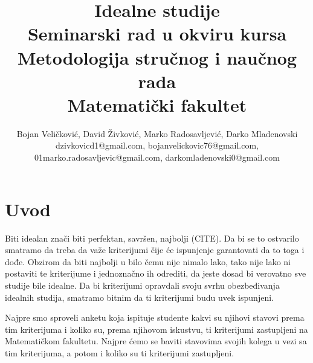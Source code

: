 \documentclass[a4paper]{article}
\begin{document}
\title{Idealne studije\\ \small{Seminarski rad u okviru kursa\\Metodologija stručnog i naučnog rada\\ Matematički fakultet}}

\author{Bojan Veličković, David Živković, Marko Radosavljević, Darko Mladenovski\\ dzivkovicd1@gmail.com, bojanvelickovic76@gmail.com, 01marko.radosavljevic@gmail.com, darkomladenovski0@gmail.com}


\maketitle


\tableofcontents

\newpage

\section{Uvod}
\label{sec:uvod}

Biti idealan znači biti perfektan, savršen, najbolji (CITE). Da bi se to ostvarilo smatramo da treba da važe kriterijumi čije će ispunjenje garantovati da to toga i dođe. Obzirom da biti najbolji u bilo čemu nije nimalo lako, tako nije lako ni postaviti te kriterijume i jednoznačno ih odrediti, da jeste dosad bi verovatno sve studije bile idealne. Da bi kriterijumi opravdali svoju svrhu obezbeđivanja idealnih studija, smatramo bitnim da ti kriterijumi budu uvek ispunjeni.

Najpre smo sproveli anketu koja ispituje studente kakvi su njihovi stavovi prema tim kriterijuma i koliko su, prema njihovom iskustvu, ti kriterijumi zastupljeni na Matematičkom fakultetu. Najpre ćemo se baviti stavovima svojih kolega u vezi sa tim kriterijuma, a potom i koliko su ti kriterijumi zastupljeni.
\end{document}
